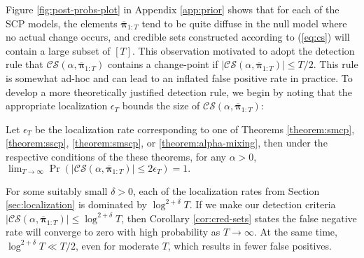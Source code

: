Figure \ref{fig:post-probs-plot} in Appendix \ref{app:prior} shows that for each of the SCP models, the elements $\overline{\boldsymbol{\pi}}_{1:T}$ tend to be quite diffuse in the null model where no actual change occurs, and credible sets constructed according to (\ref{eq:cs}) will contain a large subset of $[T]$. This observation motivated \cite{Cappello22} to adopt the detection rule that $\mathcal{CS}(\alpha,\overline{\boldsymbol{\pi}}_{1:T})$ contains a change-point if $|\mathcal{CS}(\alpha,\overline{\boldsymbol{\pi}}_{1:T})| \leq T/2$. This rule is somewhat ad-hoc and can lead to an inflated false positive rate in practice. To develop a more theoretically justified detection rule, we begin by noting that the appropriate localization $\epsilon_T$ bounds the size of $\mathcal{CS}(\alpha, \overline{\boldsymbol{\pi}}_{1:T})$:
\begin{corollary} \label{cor:cred-sets}
Let $\epsilon_T$ be the localization rate corresponding to one of Theorems \ref{theorem:smcp}, \ref{theorem:sscp}, \ref{theorem:smscp}, or \ref{theorem:alpha-mixing}, then under the respective conditions of the these theorems, for any $\alpha > 0$, $\lim_{T \to \infty} \Pr\left(|\mathcal{CS}(\alpha, \overline{\boldsymbol{\pi}}_{1:T})| \leq 2 \epsilon_T \right) = 1.$
\end{corollary}
For some suitably small $\delta > 0$, each of the localization rates from Section \ref{sec:localization} is dominated by $\log^{2+\delta} T$. If we make our detection criteria $|\mathcal{CS}(\alpha,\overline{\boldsymbol{\pi}}_{1:T})| \leq \log^{2+\delta} T$, then Corollary \ref{cor:cred-sets} states the false negative rate will converge to zero with high probability as $T \to \infty$. At the same time, $\log^{2+\delta} T \ll T / 2$, even for moderate $T$, which results in fewer false positives. 